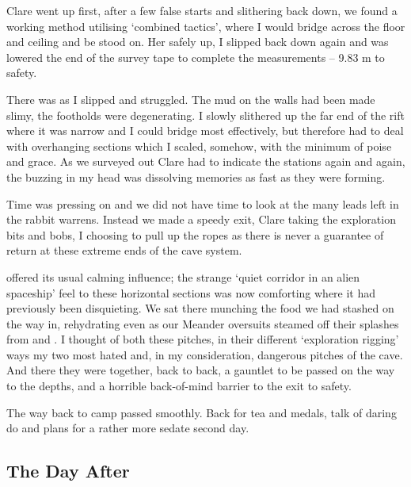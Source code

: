 Clare
went up first, after a few false starts and slithering back down, we
found a working method utilising `combined tactics', where I would
bridge across the floor and ceiling and be stood on. Her safely up, I
slipped back down again and was lowered the end of the survey tape to
complete the measurements -- 9.83 m to safety.

There was  as I slipped and struggled. The
mud on the walls had been made slimy, the footholds were degenerating. I
slowly slithered up the far end of the rift where it was narrow and I
could bridge most effectively, but therefore had to deal with
overhanging sections which I scaled, somehow, with the minimum of poise
and grace. As we surveyed out Clare had to indicate the stations again
and again, the buzzing in my head was dissolving memories as fast as
they were forming.

Time was pressing on and we did not have time to look at the many leads
left in the rabbit warrens. Instead we made a speedy exit, Clare taking
the exploration bits and bobs, I choosing to pull up the ropes as there
is never a guarantee of return at these extreme ends of the cave system.


 offered its usual calming influence; the strange `quiet
corridor in an alien spaceship' feel to these horizontal sections was
now comforting where it had previously been disquieting. We sat there munching the food
we had stashed on the way in, rehydrating even as our Meander oversuits
steamed off their splashes from  and . I thought  of both these pitches, in their
different `exploration rigging' ways my two most hated and, in my
consideration, dangerous pitches of the cave. And there they were
together, back to back, a gauntlet to be passed on the way to the
depths, and a horrible back-of-mind barrier to the exit to safety.

The way back to camp passed smoothly. Back for tea and medals, talk of
daring do and plans for a rather more sedate second day.


\subsection{The Day After}


